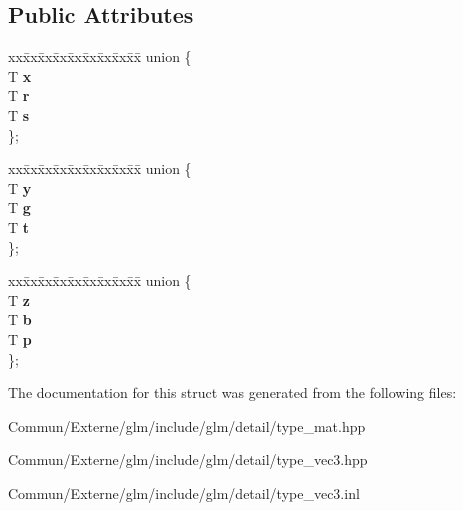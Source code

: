 \subsection*{Public Attributes}
\begin{DoxyCompactItemize}
\item 
\begin{tabbing}
xx\=xx\=xx\=xx\=xx\=xx\=xx\=xx\=xx\=\kill
union \{\\
\>T {\bfseries x}\\
\>T {\bfseries r}\\
\>T {\bfseries s}\\
\}; \hypertarget{structglm_1_1detail_1_1tvec3_a95db915d0bfa833abb7d58b568499f6f}{}\label{structglm_1_1detail_1_1tvec3_a95db915d0bfa833abb7d58b568499f6f}
\\

\end{tabbing}\item 
\begin{tabbing}
xx\=xx\=xx\=xx\=xx\=xx\=xx\=xx\=xx\=\kill
union \{\\
\>T {\bfseries y}\\
\>T {\bfseries g}\\
\>T {\bfseries t}\\
\}; \hypertarget{structglm_1_1detail_1_1tvec3_a7bab71ab14f740a398b2ea319b38be42}{}\label{structglm_1_1detail_1_1tvec3_a7bab71ab14f740a398b2ea319b38be42}
\\

\end{tabbing}\item 
\begin{tabbing}
xx\=xx\=xx\=xx\=xx\=xx\=xx\=xx\=xx\=\kill
union \{\\
\>T {\bfseries z}\\
\>T {\bfseries b}\\
\>T {\bfseries p}\\
\}; \hypertarget{structglm_1_1detail_1_1tvec3_a8155637e491e13ea65ca42b96ccc7360}{}\label{structglm_1_1detail_1_1tvec3_a8155637e491e13ea65ca42b96ccc7360}
\\

\end{tabbing}\end{DoxyCompactItemize}


The documentation for this struct was generated from the following files\+:\begin{DoxyCompactItemize}
\item 
Commun/\+Externe/glm/include/glm/detail/type\+\_\+mat.\+hpp\item 
Commun/\+Externe/glm/include/glm/detail/type\+\_\+vec3.\+hpp\item 
Commun/\+Externe/glm/include/glm/detail/type\+\_\+vec3.\+inl\end{DoxyCompactItemize}
